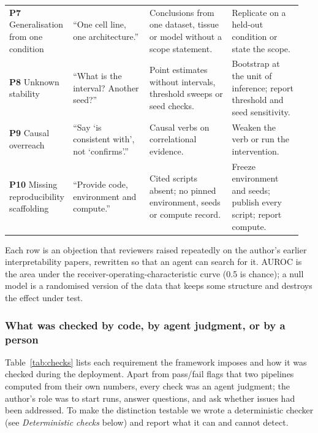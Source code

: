 \documentclass[10pt,letterpaper]{article}
\begin{document}
{\begin{longtable}{@{}p{0.17\linewidth}p{0.26\linewidth}p{0.28\linewidth}p{0.24\linewidth}@{}}
\textbf{P7} Generalisation from one condition & ``One cell line, one
architecture.'' & Conclusions from one dataset, tissue or model without
a scope statement. & Replicate on a held-out condition or state the
scope. \\
\textbf{P8} Unknown stability & ``What is the interval? Another seed?'' &
Point estimates without intervals, threshold sweeps or seed checks. &
Bootstrap at the unit of inference; report threshold and seed
sensitivity. \\
\textbf{P9} Causal overreach & ``Say `is consistent with', not
`confirms'.'' & Causal verbs on correlational evidence. & Weaken the verb
or run the intervention. \\
\textbf{P10} Missing reproducibility scaffolding & ``Provide code,
environment and compute.'' & Cited scripts absent; no pinned environment,
seeds or compute record. & Freeze environment and seeds; publish every
script; report compute. \\
\end{longtable}
\begin{flushleft}
Each row is an
objection that reviewers raised repeatedly on the author's earlier
interpretability papers, rewritten so that an agent can search for it.
AUROC is the area under the receiver-operating-characteristic curve (0.5
is chance); a null model is a randomised version of the data that keeps
some structure and destroys the effect under test.
\end{flushleft}
}


\subsubsection*{What was checked by code, by agent judgment, or by a person}
Table~\ref{tab:checks} lists each requirement the framework imposes and
how it was checked during the deployment. Apart from pass/fail flags that
two pipelines computed from their own numbers, every check was an agent
judgment; the author's role was to start runs, answer questions, and ask
whether issues had been addressed. To make the distinction testable we
wrote a deterministic checker (see \emph{Deterministic checks} below) and
report what it can and cannot detect.
\end{document}
